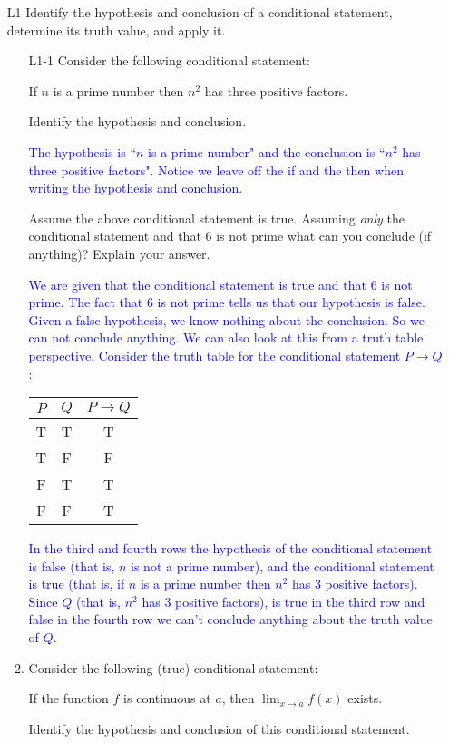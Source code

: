 \documentclass[11pt]{article}
\newcommand{\blue}{\textcolor{blue}}
\newcommand{\bs}{\begin{solution}}
\begin{document}
\begin{itemize}
\item[L1] Identify the hypothesis and conclusion of a conditional statement, determine its truth value, and apply it.
	\begin{enumerate}
	
			\item[L1-1] Consider the following conditional statement: 
	\begin{center}
	If $n$ is a prime number then $n^2$ has three positive factors.  
	\end{center}
	Identify the hypothesis and conclusion.  
	
	\bs \blue{ The hypothesis is ``$n$ is a prime number" and the conclusion is ``$n^2$ has three positive factors". Notice we leave off the if and the then when writing the hypothesis and conclusion.} \end{solution}
	
	Assume the above conditional statement is true. Assuming \emph{only} the conditional statement and that  $6$ is not prime what can you conclude (if anything)? Explain your answer.
	
	\bs \blue{We are given that the conditional statement is true and that $6$ is not prime. The fact that $6$ is not prime tells us that our hypothesis is false. Given a false hypothesis, we know nothing about the conclusion. So we can not conclude anything. We can also look at this from a truth table perspective. Consider the truth table for the conditional statement $P\rightarrow Q$: 
 }
 \begin{center}
 \begin{tabular}{c|c|c}
$P$ &$Q$ &$P\rightarrow Q$\\
\hline
T &T &T\\
T &F &F\\
F &T &T\\
F &F &T
\end{tabular}
\end{center} 
\textcolor{blue}{In the third and fourth rows the hypothesis of the conditional statement is false (that is, $n$ is not a prime number), and the conditional statement is true (that is, if $n$ is a prime number then $n^2$ has $3$ positive factors). Since $Q$ (that is, $n^2$ has $3$ positive factors), is true in the third row and false in the fourth row we can't conclude anything about the truth value of $Q$.} \end{solution}

\item[L1-2] Consider the following (true) conditional statement: 
	\begin{center}
	If the function $f$ is continuous at $a$, then $\displaystyle{\lim_{x\to a} f(x)}$ exists.
\end{center}
	Identify the hypothesis and conclusion of this conditional statement.
	

\end{enumerate}
\end{itemize}
\end{document}
